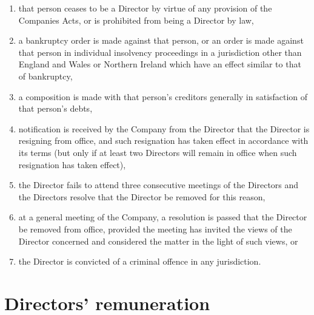 \documentclass[a4paper,12pt]{article}
\renewcommand{\labelenumi}{\thesection.\arabic{enumi}}
\begin{document}
\begin{enumerate}
  \renewcommand{\labelenumi}{(\alph{enumi})}
  \item that person ceases to be a Director by virtue of any provision of the Companies Acts, or is prohibited from being a Director by law,
  \item a bankruptcy order is made against that person, or an order is made against that person in individual insolvency proceedings in a jurisdiction other than England and Wales or Northern Ireland which have an effect similar to that of bankruptcy,
  \item a composition is made with that person's creditors generally in satisfaction of that person's debts,
  \item notification is received by the Company from the Director that the Director is resigning from office, and such resignation has taken effect in accordance with its terms (but only if at least two Directors will remain in office when such resignation has taken effect),
  \item the Director fails to attend three consecutive meetings of the Directors and the Directors resolve that the Director be removed for this reason,
  \item at a general meeting of the Company, a resolution is passed that the Director be removed from office, provided the meeting has invited the views of the Director concerned and considered the matter in the light of such views, or
  \item the Director is convicted of a criminal offence in any jurisdiction.
\end{enumerate}

\section{Directors' remuneration}
\end{document}
